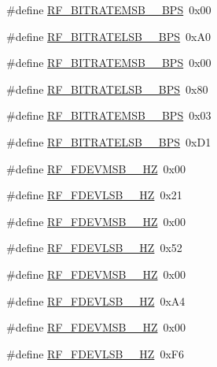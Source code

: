 \begin{DoxyCompactItemize}
\#define \mbox{\hyperlink{sx1276_regs-_fsk_8h_a2820d9407f3f886ccc4b95f37bdba43a}{R\+F\+\_\+\+B\+I\+T\+R\+A\+T\+E\+M\+S\+B\+\_\+\_\+\+B\+PS}}~0x00
\item 
\#define \mbox{\hyperlink{sx1276_regs-_fsk_8h_a5dc775df5325cee5e4f068777ec7d0ce}{R\+F\+\_\+\+B\+I\+T\+R\+A\+T\+E\+L\+S\+B\+\_\+\_\+\+B\+PS}}~0x\+A0
\item 
\#define \mbox{\hyperlink{sx1276_regs-_fsk_8h_a2929fca60be7a159f4f0b3768f60d811}{R\+F\+\_\+\+B\+I\+T\+R\+A\+T\+E\+M\+S\+B\+\_\+\_\+\+B\+PS}}~0x00
\item 
\#define \mbox{\hyperlink{sx1276_regs-_fsk_8h_a39ce2c4b4f89ca91ee4a9a943341a75f}{R\+F\+\_\+\+B\+I\+T\+R\+A\+T\+E\+L\+S\+B\+\_\+\_\+\+B\+PS}}~0x80
\item 
\#define \mbox{\hyperlink{sx1276_regs-_fsk_8h_a7110c5c5081018aa2856943a0cf1223c}{R\+F\+\_\+\+B\+I\+T\+R\+A\+T\+E\+M\+S\+B\+\_\+\_\+\+B\+PS}}~0x03
\item 
\#define \mbox{\hyperlink{sx1276_regs-_fsk_8h_a358a84803ccf3e4c4896cdbd43576c08}{R\+F\+\_\+\+B\+I\+T\+R\+A\+T\+E\+L\+S\+B\+\_\+\_\+\+B\+PS}}~0x\+D1
\item 
\#define \mbox{\hyperlink{sx1276_regs-_fsk_8h_a5f494883fb5d77b75be547962cc3bc55}{R\+F\+\_\+\+F\+D\+E\+V\+M\+S\+B\+\_\+\_\+\+HZ}}~0x00
\item 
\#define \mbox{\hyperlink{sx1276_regs-_fsk_8h_acf567929b56d3921b2d717142b29275b}{R\+F\+\_\+\+F\+D\+E\+V\+L\+S\+B\+\_\+\_\+\+HZ}}~0x21
\item 
\#define \mbox{\hyperlink{sx1276_regs-_fsk_8h_ae6ae0e5b1aa1a2bdd92b3c9fccdb533c}{R\+F\+\_\+\+F\+D\+E\+V\+M\+S\+B\+\_\+\_\+\+HZ}}~0x00
\item 
\#define \mbox{\hyperlink{sx1276_regs-_fsk_8h_adafffdefc88466fdb255869839356960}{R\+F\+\_\+\+F\+D\+E\+V\+L\+S\+B\+\_\+\_\+\+HZ}}~0x52
\item 
\#define \mbox{\hyperlink{sx1276_regs-_fsk_8h_a687bcf3879dd873acbd21cba5b7142c5}{R\+F\+\_\+\+F\+D\+E\+V\+M\+S\+B\+\_\+\_\+\+HZ}}~0x00
\item 
\#define \mbox{\hyperlink{sx1276_regs-_fsk_8h_a0751e1ea52818613b7a5e3476607f646}{R\+F\+\_\+\+F\+D\+E\+V\+L\+S\+B\+\_\+\_\+\+HZ}}~0x\+A4
\item 
\#define \mbox{\hyperlink{sx1276_regs-_fsk_8h_a91093fabca4892b315095dc0283828c7}{R\+F\+\_\+\+F\+D\+E\+V\+M\+S\+B\+\_\+\_\+\+HZ}}~0x00
\item 
\#define \mbox{\hyperlink{sx1276_regs-_fsk_8h_a5331d1f2a7cd8c568218d901d2a388ce}{R\+F\+\_\+\+F\+D\+E\+V\+L\+S\+B\+\_\+\_\+\+HZ}}~0x\+F6

\end{DoxyCompactItemize}
